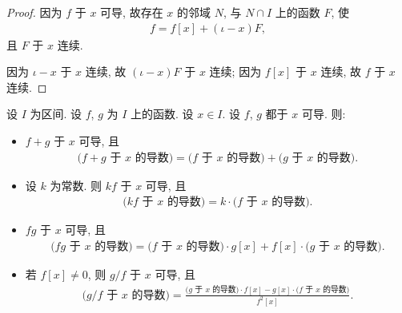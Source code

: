 \begin{proof}
    因为 $f$ 于 $x$ 可导, 故存在 $x$ 的邻域 $N$, 与 $N \cap I$ 上的函数 $F$, 使
    \begin{align*}
        f = f[x] + (\iota - x)F,
    \end{align*}
    且 $F$ 于 $x$ 连续.

    因为 $\iota - x$ 于 $x$ 连续, 故 $(\iota - x)F$ 于 $x$ 连续; 因为 $f[x]$ 于 $x$ 连续, 故 $f$ 于 $x$ 连续.
\end{proof}

\begin{theorem}
    设 $I$ 为区间. 设 $f$, $g$ 为 $I$ 上的函数. 设 $x \in I$. 设 $f$, $g$ 都于 $x$ 可导. 则:
    \begin{itemize}
        \item $f + g$ 于 $x$ 可导, 且
              \begin{align*}
                  \text{($f + g$ 于 $x$ 的导数)} = \text{($f$ 于 $x$ 的导数)} + \text{($g$ 于 $x$ 的导数)}.
              \end{align*}
        \item 设 $k$ 为常数. 则 $kf$ 于 $x$ 可导, 且
              \begin{align*}
                  \text{($kf$ 于 $x$ 的导数)} = k \cdot \text{($f$ 于 $x$ 的导数)}.
              \end{align*}
        \item $fg$ 于 $x$ 可导, 且
              \begin{align*}
                  \text{($fg$ 于 $x$ 的导数)} = \text{($f$ 于 $x$ 的导数)} \cdot g[x] + f[x] \cdot \text{($g$ 于 $x$ 的导数)}.
              \end{align*}
        \item 若 $f[x] \neq 0$, 则 $g/f$ 于 $x$ 可导, 且
              \begin{align*}
                  \text{(${g}/{f}$ 于 $x$ 的导数)} = \frac{\text{($g$ 于 $x$ 的导数)} \cdot f[x] - g[x] \cdot \text{($f$ 于 $x$ 的导数)}}{f^2 [x]}.
              \end{align*}
    \end{itemize}
\end{theorem}

